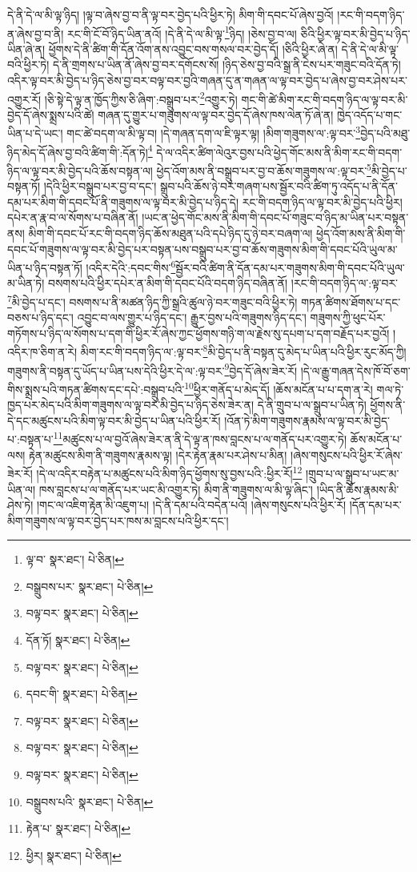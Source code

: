 དེ་ནི་དེ་ལ་མི་ལྟ་ཉིད། །ལྟ་བ་ཞེས་བྱ་བ་ནི་ལྟ་བར་བྱེད་པའི་ཕྱིར་ཏེ། མིག་གི་དབང་པོ་ཞེས་བྱའོ། །རང་གི་བདག་ཉིད་ན་ཞེས་བྱ་བ་ནི། རང་གི་ངོ་བོ་ཉིད་ཡིན་ནའོ། །དེ་ནི་དེ་ལ་མི་ལྟ་\footnote{ལྟ་བ་  སྣར་ཐང་།  པེ་ཅིན། }ཉིད། །ཅེས་བྱ་བ་ལ། ཅིའི་ཕྱིར་ལྟ་བར་མི་བྱེད་པ་ཉིད་ཡིན་ཞེ་ན། ཕྱོགས་དེ་ནི་ཚིག་གི་དོན་འོག་ནས་འབྱུང་བས་གསལ་བར་བྱེད་དོ། །ཅིའི་ཕྱིར་ཞེ་ན། དེ་ནི་དེ་ལ་མི་ལྟ་བའི་ཕྱིར་ཏེ། དེ་ནི་གྲགས་པ་ཡིན་ནོ་ཞེས་བྱ་བར་དགོངས་སོ། །ཉིད་ཅེས་བྱ་བའི་སྒྲ་ནི་ངེས་པར་གཟུང་བའི་དོན་ཏེ། འདིར་ལྟ་བར་མི་བྱེད་པ་ཉིད་ཅེས་བྱ་བར་བལྟ་བར་བྱའི་གཞན་དུ་ན་གཞན་ལ་ལྟ་བར་བྱེད་པ་ཞེས་བྱ་བར་ཤེས་པར་འགྱུར་རོ། །ཅི་སྟེ་དེ་ལྟ་ན་ཁྱོད་ཀྱིས་ཅི་ཞིག་:བསྒྲུབ་པར་\footnote{བསྒྲུབས་པར་  སྣར་ཐང་།  པེ་ཅིན། }འགྱུར་ཏེ། གང་གི་ཚེ་མིག་རང་གི་བདག་ཉིད་ལ་ལྟ་བར་མི་བྱེད་དོ་ཞེས་སྨྲས་པའི་ཚེ། གཞན་དུ་གྱུར་པ་གཟུགས་ལ་ལྟ་བར་བྱེད་དོ་ཞེས་ཁས་ལེན་ཏོ་ཞེ་ན། ཁྱེད་འདོད་པ་གང་ཡིན་པ་དེ་ཡང་། གང་ཚེ་བདག་ལ་མི་ལྟ་བ། །དེ་གཞན་དག་ལ་ཇི་ལྟར་ལྟ། །མིག་གཟུགས་ལ་:ལྟ་བར་\footnote{བལྟ་བར་  སྣར་ཐང་།  པེ་ཅིན། }བྱེད་པའི་མཐུ་ཉིད་མེད་དོ་ཞེས་བྱ་བའི་ཚིག་གི་:དོན་ཏེ།\footnote{དོན་ཏོ།  སྣར་ཐང་།  པེ་ཅིན། } དེ་ལ་འདིར་ཚིག་ལེའུར་བྱས་པའི་ཕྱེད་གོང་མས་ནི་མིག་རང་གི་བདག་ཉིད་ལ་ལྟ་བར་མི་བྱེད་པའི་ཆོས་བསྟན་ལ། ཕྱེད་འོག་མས་ནི་བསྒྲུབ་པར་བྱ་བ་ཆོས་གཟུགས་ལ་:ལྟ་བར་\footnote{བལྟ་བར་  སྣར་ཐང་།  པེ་ཅིན། }མི་བྱེད་པ་བསྟན་ཏོ། །དེའི་ཕྱིར་བསྒྲུབ་པར་བྱ་བ་དང་། སྒྲུབ་པའི་ཆོས་ཉེ་བར་གཞག་པས་སྦྱོར་བའི་ཚིག་ཏུ་འདོད་པ་ནི་དོན་དམ་པར་མིག་གི་དབང་པོ་ནི་གཟུགས་ལ་ལྟ་བར་མི་བྱེད་པ་ཉིད་དེ། རང་གི་བདག་ཉིད་ལ་ལྟ་བར་མི་བྱེད་པའི་ཕྱིར། དཔེར་ན་རྣ་བ་ལ་སོགས་པ་བཞིན་ནོ། །ཡང་ན་ཕྱེད་གོང་མས་ནི་མིག་གི་དབང་པོ་གཟུང་བ་ཉིད་མ་ཡིན་པར་བསྟན་ནས། མིག་གི་དབང་པོ་རང་གི་བདག་ཉིད་ཆོས་མཐུན་པའི་དཔེ་ཉིད་དུ་ཉེ་བར་བཞག་ལ། ཕྱེད་འོག་མས་ནི་མིག་གི་དབང་པོ་གཟུགས་ལ་ལྟ་བར་མི་བྱེད་པར་བསྟན་པས་བསྒྲུབ་པར་བྱ་བ་ཆོས་གཟུགས་མིག་གི་དབང་པོའི་ཡུལ་མ་ཡིན་པ་ཉིད་བསྟན་ཏོ། །འདིར་དེའི་:དབང་གིས་\footnote{དབང་གི་  སྣར་ཐང་།  པེ་ཅིན། }སྦྱོར་བའི་ཚིག་ནི་དོན་དམ་པར་གཟུགས་མིག་གི་དབང་པོའི་ཡུལ་མ་ཡིན་ཏེ། བསགས་པའི་ཕྱིར་དཔེར་ན་མིག་གི་དབང་པོའི་བདག་ཉིད་བཞིན་ནོ། །རང་གི་བདག་ཉིད་ལ་:ལྟ་བར་\footnote{བལྟ་བར་  སྣར་ཐང་།  པེ་ཅིན། }མི་བྱེད་པ་དང་། བསགས་པ་ནི་མཚན་ཉིད་ཀྱི་སྒྲའི་ཚུལ་ཉེ་བར་གཟུང་བའི་ཕྱིར་ཏེ། གཏན་ཚིགས་ཐོགས་པ་དང་བཅས་པ་ཉིད་དང་། འབྱུང་བ་ལས་གྱུར་པ་ཉིད་དང་། རྒྱུར་བྱས་པའི་གཟུགས་ཉིད་དང་། གཟུགས་ཀྱི་ཕུང་པོར་གཏོགས་པ་ཉིད་ལ་སོགས་པ་དག་གི་ཕྱིར་རོ་ཞེས་ཀྱང་ཕྱོགས་གཉི་ག་ལ་རྗེས་སུ་དཔག་པ་དག་བརྗོད་པར་བྱའོ། །འདིར་ཁ་ཅིག་ན་རེ། མིག་རང་གི་བདག་ཉིད་ལ་:ལྟ་བར་\footnote{བལྟ་བར་  སྣར་ཐང་།  པེ་ཅིན། }མི་བྱེད་པ་ནི་བསྟན་དུ་མེད་པ་ཡིན་པའི་ཕྱིར་རུང་མོད་ཀྱི། གཟུགས་ནི་བསྟན་དུ་ཡོད་པ་ཡིན་པས་དེའི་ཕྱིར་དེ་ལ་:ལྟ་བར་\footnote{བལྟ་བར་  སྣར་ཐང་།  པེ་ཅིན། }བྱེད་དོ་ཞེས་ཟེར་རོ། །དེ་ལ་རྒྱུ་གཞན་དེས་ཁོ་བོ་ཅག་གིས་སྨྲས་པའི་གཏན་ཚིགས་དང་དཔེ་:བསྒྲུབ་པའི་\footnote{བསྒྲུབས་པའི་  སྣར་ཐང་།  པེ་ཅིན། }ཕྱིར་གནོད་པ་མེད་དོ། །ཆོས་མངོན་པ་པ་དག་ན་རེ། གལ་ཏེ་ཁྱད་པར་མེད་པའི་མིག་གཟུགས་ལ་ལྟ་བར་མི་བྱེད་པ་ཉིད་ཅེས་ཟེར་ན། དེ་ནི་གྲུབ་པ་ལ་སྒྲུབ་པ་ཡིན་ཏེ། ཕྱོགས་ནི་དེ་དང་མཚུངས་པའི་མིག་ལྟ་བར་མི་བྱེད་པ་ཡིན་པའི་ཕྱིར་རོ། །འོན་ཏེ་མིག་གཟུགས་རྣམས་ལ་ལྟ་བར་མི་བྱེད་པ་:བསྟན་པ་\footnote{རྟེན་པ་  སྣར་ཐང་།  པེ་ཅིན། }མཚུངས་པ་ལ་བྱའོ་ཞེས་ཟེར་ན་ནི་དེ་ལྟ་ན་ཁས་བླངས་པ་ལ་གནོད་པར་འགྱུར་ཏེ། ཆོས་མངོན་པ་ལས། རྟེན་མཚུངས་མིག་ནི་གཟུགས་རྣམས་ལྟ། །དེར་རྟེན་རྣམ་པར་ཤེས་པ་མིན། །ཞེས་གསུངས་པའི་ཕྱིར་རོ་ཞེས་ཟེར་རོ། །དེ་ལ་འདིར་བརྟེན་པ་མཚུངས་པའི་མིག་ཉིད་ཕྱོགས་སུ་བྱས་པའི་:ཕྱིར་རོ།\footnote{ཕྱིར།  སྣར་ཐང་།  པེ་ཅིན། } །གྲུབ་པ་ལ་སྒྲུབ་པ་ཡང་མ་ཡིན་ལ། ཁས་བླངས་པ་ལ་གནོད་པར་ཡང་མི་འགྱུར་ཏེ། མིག་ནི་གཟུགས་ལ་མི་ལྟ་ཞིང་། །ཡིད་ནི་ཆོས་རྣམས་མི་ཤེས་ཏེ། །གང་ལ་འཇིག་རྟེན་མི་འཇུག་པ། །དེ་ནི་དམ་པའི་བདེན་པའོ། །ཞེས་གསུངས་པའི་ཕྱིར་རོ། །དོན་དམ་པར་མིག་གཟུགས་ལ་ལྟ་བར་བྱེད་པར་ཁས་མ་བླངས་པའི་ཕྱིར་དང་། 